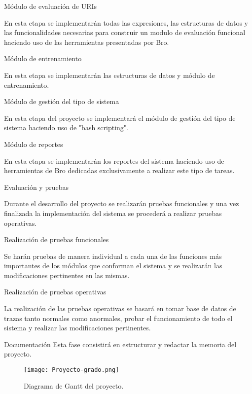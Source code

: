 \begin{legal}
\begin{legal}
\item Módulo de evaluación de URIs 

En esta etapa  se implementarán todas las expresiones, las estructuras de datos y las funcionalidades necesarias para construir un modulo de evaluación funcional haciendo uso de las herramientas presentadas por Bro. 

\item Módulo de entrenamiento 

En esta etapa se implementarán las estructuras de datos y módulo de entrenamiento.

\item Módulo de gestión del tipo de sistema

En esta etapa del proyecto se implementará el módulo de gestión del tipo de sistema haciendo uso de "bash scripting". 

\item Módulo de reportes

En esta etapa se implementarán los reportes del sistema haciendo uso de herramientas de Bro dedicadas exclusivamente a realizar este tipo de tareas.

\end{legal}
\item Evaluación y pruebas 

Durante el desarrollo del proyecto se realizarán pruebas funcionales y una vez finalizada la implementación del sistema se procederá a realizar pruebas operativas.
\begin{legal}
\item Realización de pruebas funcionales

Se harán pruebas de manera individual a cada una de las funciones más importantes de los módulos que conforman el sistema y se realizarán las modificaciones pertinentes en las mismas.

\item Realización de pruebas operativas

La realización de las pruebas operativas se basará en tomar base de datos de trazas tanto normales como anormales, probar el funcionamiento de todo el sistema y realizar las modificaciones pertinentes.

\end{legal}

\item Documentación  
 Esta fase consistirá en estructurar y redactar la memoria del proyecto.
\end{legal}

\begin{figure}[tb]
\begin{center}
\texttt{[image: Proyecto-grado.png]}
\caption{Diagrama de Gantt del proyecto.}\label{fig1}
\end{center}
\end{figure}

